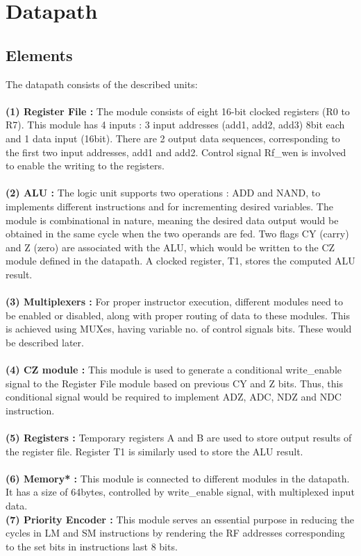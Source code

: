 \documentclass[11pt,fleqn,oneside]{book} %
\begin{document}


\chapter{Datapath}

\section{Elements}
The datapath consists of the described units: \\ \\
\textbf{(1) Register File :} The module consists of eight 16-bit clocked registers (R0 to R7). This module has 4 inputs : 3 input addresses (add1, add2, add3) 8bit each and 1 data input (16bit). There are 2 output data sequences, corresponding to the first two input addresses, add1 and add2. Control signal Rf\_wen is involved to enable the writing to the registers.  \\ \\ \textbf{(2) ALU :} The logic unit supports two operations : ADD and NAND, to implements different instructions and for incrementing desired variables. The module is combinational in nature, meaning the desired data output would be obtained in the same cycle when the two operands are fed. Two flags CY (carry) and Z (zero) are associated with the ALU, which would be written to the CZ module defined in the datapath. A clocked register, T1, stores the computed ALU result. \\ \\ \textbf{(3) Multiplexers :} For proper instructor execution, different modules need to be enabled or disabled, along with proper routing of data to these modules. This is achieved using MUXes, having variable no. of control signals bits. These would be described later. \\ \\ \textbf{(4) CZ module :} This module is used to generate a conditional write\_enable signal to the Register File module based on previous CY and Z bits. Thus, this conditional signal would be required to implement ADZ, ADC, NDZ and NDC instruction. \\ \\ \textbf{(5) Registers :} Temporary registers A and B are used to store output results of the register file. Register T1 is similarly used to store the ALU result. \\ \\ \textbf{(6) Memory* :} This module is connected to different modules in the datapath. It has a size of 64bytes, controlled by write\_enable signal, with multiplexed input data.\\ \textbf{(7) Priority Encoder :} This module serves an essential purpose in reducing the cycles in LM and SM instructions by rendering the RF addresses corresponding to the set bits in instructions last 8 bits.
\end{document}
